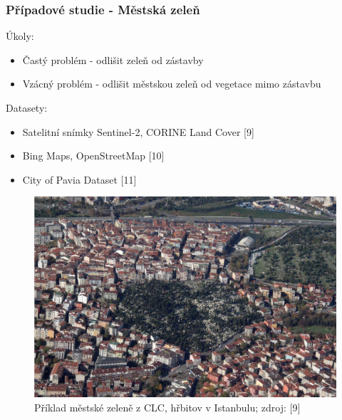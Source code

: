 \documentclass[10pt, t]{beamer}
\begin{document}
\begin{frame}

\frametitle{Případové studie - Městská zeleň}

Úkoly:

\begin{itemize}
	\item Častý problém - odlišit zeleň od zástavby
	\item Vzácný problém - odlišit městskou zeleň od vegetace mimo zástavbu
\end{itemize}

Datasety:

\begin{itemize}
	\item Satelitní snímky Sentinel-2, CORINE Land Cover [9]
	\item Bing Maps, OpenStreetMap [10]
	\item City of Pavia Dataset [11]
\end{itemize}

\begin{figure}[h]
   \centering
	\includegraphics[width=0.55\linewidth]{../pictures/urban-vegetation-clc-02.png}
	\caption[]{Příklad městské zeleně z CLC, hřbitov v Istanbulu; zdroj: [9]}
      \label{fig-urban-green-2}
\end{figure}

\end{frame}

\end{document}
